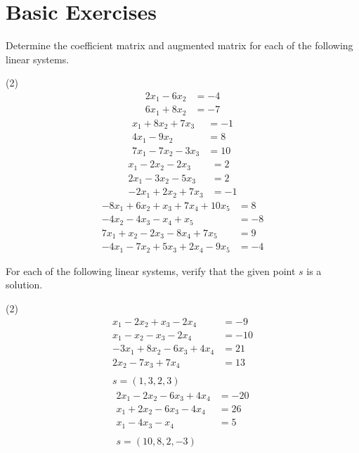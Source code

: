 \section{Basic Exercises}

Determine the coefficient matrix and augmented matrix for each of the
following linear systems.
\begin{tasks}[style=enumerate](2)
\task
  \begin{align*}
    2 x_{1} - 6 x_{2} &= -4 \\
    6 x_{1} + 8 x_{2} &= -7
  \end{align*}
\task
  \begin{align*}
    x_{1} + 8 x_{2} + 7 x_{3} &= -1 \\
    4 x_{1} - 9 x_{2} &= 8 \\
    7 x_{1} - 7 x_{2} - 3 x_{3} &= 10
  \end{align*}
\task
  \begin{align*}
    x_{1} - 2x_{2} - 2x_{3} &= 2 \\
    2x_{1} - 3x_{2} - 5x_{3} &= 2 \\
    -2x_{1} + 2x_{2} + 7x_{3} &= -1
  \end{align*}
\task
  \begin{align*}
    - 8 x_{1} + 6 x_{2} + x_{3} + 7 x_{4} + 10 x_{5} &= 8 \\
    - 4 x_{2} - 4 x_{3} - x_{4} + x_{5} &= -8 \\
    7 x_{1} + x_{2} - 2 x_{3} - 8 x_{4} + 7 x_{5} &= 9 \\
    - 4 x_{1} - 7 x_{2} + 5 x_{3} + 2 x_{4} - 9 x_{5} &= -4
  \end{align*}
\end{tasks}
For each of the following linear systems, verify that the given point
$s$ is a solution.
\begin{tasks}[resume, style=enumerate](2)
\task
  \begin{align*}
    x_{1} - 2x_{2} + x_{3} - 2x_{4} &= -9 \\
    x_{1} - x_{2} - x_{3} - 2x_{4} &= -10 \\
    -3x_{1} + 8x_{2} - 6x_{3} + 4x_{4} &= 21 \\
    2x_{2} - 7x_{3} + 7x_{4} &= 13 \\
    \\
    s = (1, 3, 2, 3)
  \end{align*}
\task
  \begin{align*}
    2 x_{1} - 2 x_{2} - 6 x_{3} + 4 x_{4} &= -20 \\
    x_{1} + 2 x_{2} - 6 x_{3} - 4 x_{4} &= 26 \\
    x_{1} - 4 x_{3} - x_{4} &= 5 \\
    \\
    s = (10, 8, 2, -3)
  \end{align*}
\end{tasks}
